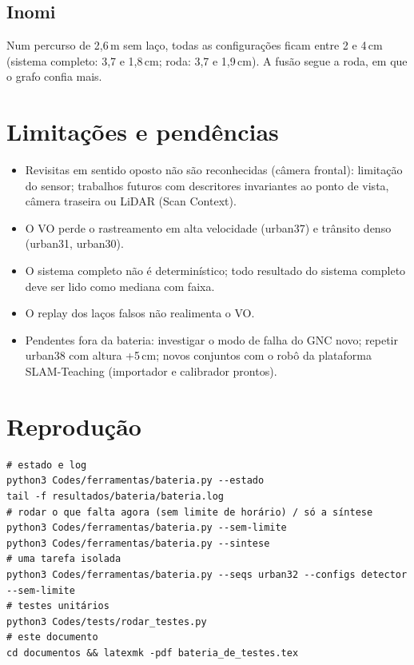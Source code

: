 \documentclass[11pt,a4paper]{article}
\begin{document}
\subsection{Inomi}
Num percurso de 2,6\,m sem laço, todas as configurações ficam entre 2 e 4\,cm (sistema completo: 3,7 e 1,8\,cm;
roda: 3,7 e 1,9\,cm). A fusão segue a roda, em que o grafo confia mais.

\section{Limitações e pendências}
\begin{itemize}
  \item Revisitas em sentido oposto não são reconhecidas (câmera frontal): limitação do sensor; trabalhos futuros com
        descritores invariantes ao ponto de vista, câmera traseira ou LiDAR (Scan Context).
  \item O VO perde o rastreamento em alta velocidade (urban37) e trânsito denso (urban31, urban30).
  \item O sistema completo não é determinístico; todo resultado do sistema completo deve ser lido como mediana com faixa.
  \item O replay dos laços falsos não realimenta o VO.
  \item Pendentes fora da bateria: investigar o modo de falha do GNC novo; repetir urban38 com altura +5\,cm; novos
        conjuntos com o robô da plataforma SLAM-Teaching (importador e calibrador prontos).
\end{itemize}

\section{Reprodução}
\begin{verbatim}
# estado e log
python3 Codes/ferramentas/bateria.py --estado
tail -f resultados/bateria/bateria.log
# rodar o que falta agora (sem limite de horário) / só a síntese
python3 Codes/ferramentas/bateria.py --sem-limite
python3 Codes/ferramentas/bateria.py --sintese
# uma tarefa isolada
python3 Codes/ferramentas/bateria.py --seqs urban32 --configs detector --sem-limite
# testes unitários
python3 Codes/tests/rodar_testes.py
# este documento
cd documentos && latexmk -pdf bateria_de_testes.tex
\end{verbatim}
\end{document}
